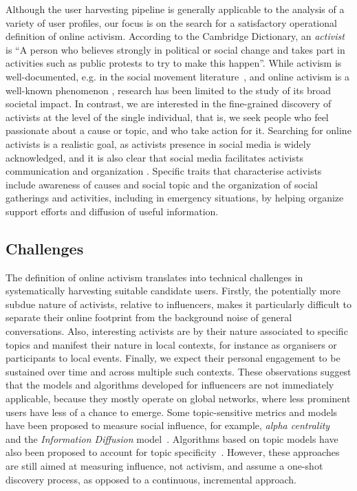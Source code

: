 Although the user harvesting pipeline is generally applicable to the analysis of a variety of user profiles, our focus is on the search for a satisfactory operational definition of online activism. 
%
According to the Cambridge Dictionary, an \textit{activist} is ``A person who believes strongly in political or social change and takes part in activities such as public protests to try to make this happen''.
%
While activism is well-documented, e.g. in the social movement literature~\cite{doi:10.1080/14742830701497277}, and online activism is a well-known phenomenon \cite{IJoC1246}, research has been limited to the study of its broad societal impact. 
In contrast, we are interested in the fine-grained discovery of activists at the level of the single individual, that is, we seek people who feel passionate about a cause or topic, and who take action for it. 
Searching for online activists is a realistic goal, as activists presence in social media is widely acknowledged, and it is also clear that social media facilitates activists communication and organization \cite{Poell2014,Youmans2012}. 
Specific traits that characterise activists include awareness of causes and social topic and the organization of social gatherings and activities, including in emergency situations, by helping organize support efforts and diffusion of useful information.
 
\subsection{Challenges}
 
The definition of online activism translates into technical challenges in systematically harvesting suitable candidate users.
%
Firstly, the potentially more subdue nature of activists, relative to influencers, makes it particularly difficult to separate their online footprint from the background noise of general conversations.
Also, interesting activists are by their nature associated to specific topics and manifest their nature in local contexts, for instance as organisers or participants to local events. 
Finally, we expect their personal engagement to be sustained over time and across multiple such contexts. 
These observations suggest that the models and algorithms developed for influencers are not immediately applicable, because they mostly operate on global networks, where less prominent users have less of a chance to emerge.
Some topic-sensitive metrics and models have been proposed to measure social influence, for example, \textit{alpha centrality}~\cite{Bonacich2001,Overbey2013} and the \textit{Information Diffusion} model~\cite{Pal2011}. Algorithms based on topic models have also been proposed to account for topic specificity~\cite{Zhao2011b}. However, these approaches are still aimed at measuring influence, not activism, and assume a one-shot discovery process, as opposed to a continuous, incremental approach.

